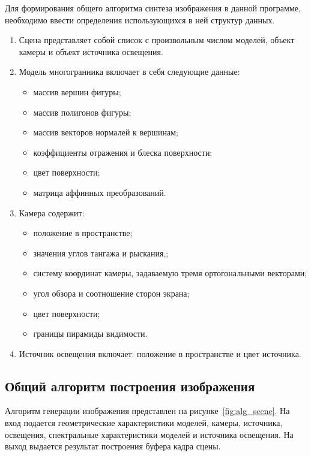 Для формирования общего алгоритма синтеза изображения в данной программе, необходимо ввести определения использующихся в ней структур данных.
\begin{enumerate}
	\item Сцена представляет собой список с произвольным числом моделей, объект камеры и объект источника освещения.
	\item Модель многогранника включает в себя следующие данные:
	\begin{itemize}
		\item массив вершин фигуры;
		\item массив полигонов фигуры;
		\item массив векторов нормалей к вершинам;
		\item коэффициенты отражения и блеска поверхности;
		\item цвет поверхности;
		\item матрица аффинных преобразований.
	\end{itemize}
	\item Камера содержит:
	\begin{itemize}
		\item положение в пространстве;
		\item значения углов тангажа и рыскания,;
		\item систему координат камеры, задаваемую тремя ортогональными векторами;
		\item угол обзора и соотношение сторон экрана;
		\item цвет поверхности;
		\item границы пирамиды видимости.
	\end{itemize}
	\item Источник освещения включает: положение в пространстве и цвет источника.
\end{enumerate}

\subsection{Общий алгоритм построения изображения}

Алгоритм генерации изображения представлен на рисунке~\ref{fig:alg_scene}.
На вход подается геометрические характеристики моделей, камеры, источника, освещения, спектральные характеристики моделей и источника освещения.
На выход выдается результат построения буфера кадра сцены.

